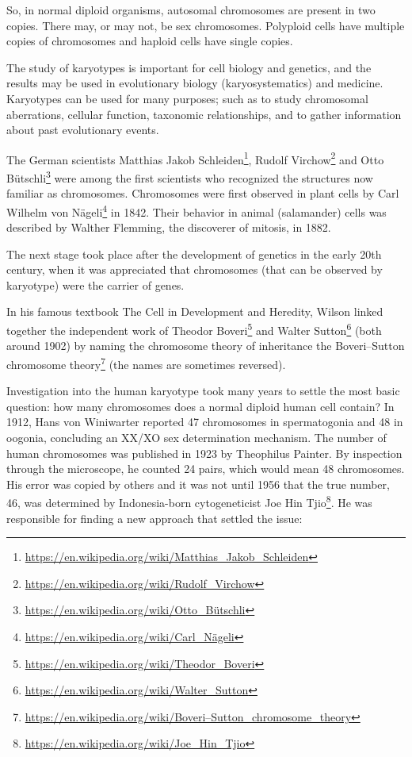 \documentclass[]{book}
\let\rmarkdownfootnote\footnote%
\def\footnote{\protect\rmarkdownfootnote}
\renewcommand{\href}[2]{#2\footnote{\url{#1}}}
\begin{document}
So, in normal diploid organisms, autosomal chromosomes are present in two copies. There may, or may not, be sex chromosomes. Polyploid cells have multiple copies of chromosomes and haploid cells have single copies.

The study of karyotypes is important for cell biology and genetics, and the results may be used in evolutionary biology (karyosystematics) and medicine. Karyotypes can be used for many purposes; such as to study chromosomal aberrations, cellular function, taxonomic relationships, and to gather information about past evolutionary events.

The German scientists Matthias \href{https://en.wikipedia.org/wiki/Matthias_Jakob_Schleiden}{Jakob Schleiden}, \href{https://en.wikipedia.org/wiki/Rudolf_Virchow}{Rudolf Virchow} and \href{https://en.wikipedia.org/wiki/Otto_Bütschli}{Otto Bütschli} were among the first scientists who recognized the structures now familiar as chromosomes. Chromosomes were first observed in plant cells by \href{https://en.wikipedia.org/wiki/Carl_Nägeli}{Carl Wilhelm von Nägeli} in 1842. Their behavior in animal (salamander) cells was described by Walther Flemming, the discoverer of mitosis, in 1882.

The next stage took place after the development of genetics in the early 20th century, when it was appreciated that chromosomes (that can be observed by karyotype) were the carrier of genes.

In his famous textbook The Cell in Development and Heredity, Wilson linked together the independent work of \href{https://en.wikipedia.org/wiki/Theodor_Boveri}{Theodor Boveri} and \href{https://en.wikipedia.org/wiki/Walter_Sutton}{Walter Sutton} (both around 1902) by naming the chromosome theory of inheritance the \href{https://en.wikipedia.org/wiki/Boveri–Sutton_chromosome_theory}{Boveri--Sutton chromosome theory} (the names are sometimes reversed).

Investigation into the human karyotype took many years to settle the most basic question: how many chromosomes does a normal diploid human cell contain? In 1912, Hans von Winiwarter reported 47 chromosomes in spermatogonia and 48 in oogonia, concluding an XX/XO sex determination mechanism. The number of human chromosomes was published in 1923 by Theophilus Painter. By inspection through the microscope, he counted 24 pairs, which would mean 48 chromosomes. His error was copied by others and it was not until 1956 that the true number, 46, was determined by Indonesia-born cytogeneticist \href{https://en.wikipedia.org/wiki/Joe_Hin_Tjio}{Joe Hin Tjio}. He was responsible for finding a new approach that settled the issue:
\end{document}
